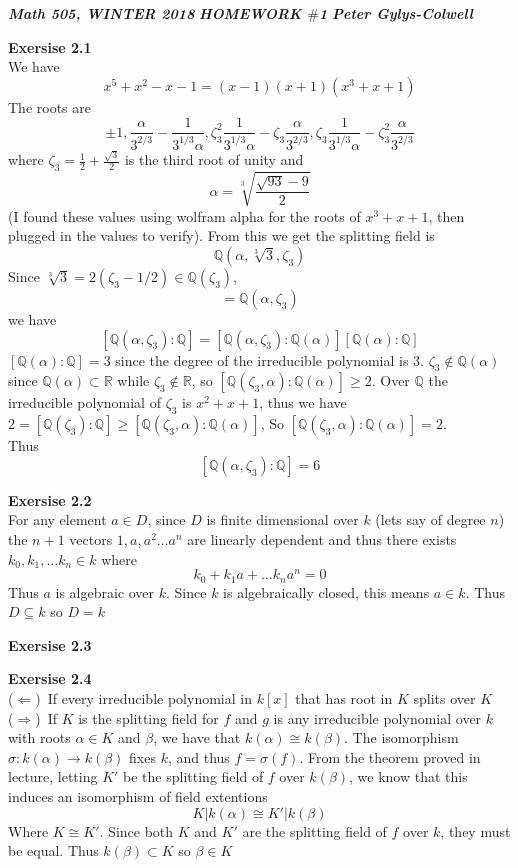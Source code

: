 \documentclass[12pt]{article}
\newenvironment{ques}[1]{\textbf{Exersise #1}\vspace{1 mm}\\ }{\bigskip}
\theoremstyle{definition}
\newcommand{\R}{\mathbb R}
\newcommand{\Q}{\mathbb Q}
\renewcommand{\a}{\alpha}
\begin{document}
\noindent \textit{\textbf{Math 505, WINTER 2018}} \hspace{1.3cm}
\textit{\textbf{HOMEWORK $\#$1}} \hspace{1.3cm} \textit{\textbf{Peter
Gylys-Colwell}} 

\vspace{1cm}

\begin{ques}{2.1}
	We have
	$$x^5 + x^2 - x - 1 = (x - 1)(x + 1)(x^3 + x + 1)$$
	The roots are 
	$$\pm 1, \frac{\a}{3^{2/3}} - \frac{1}{3^{1/3}\a},
	\zeta_3^2\frac{1}{3^{1/3}\a}-\zeta_3\frac{\a}{3^{2/3}},
	\zeta_3\frac{1}{3^{1/3}\a}-\zeta_3^2\frac{\a}{3^{2/3}}$$ 
	where
	$\zeta_3 = \frac 1 2 + \frac {\sqrt 3} {2}$ is the third root of unity and
	$$\a = \sqrt[3]{\frac{\sqrt{93} - 9}{2}}$$
	(I found these values using wolfram alpha for the roots of $x^3 + x + 1$,
	then plugged in the values to verify). From this we get the splitting field
	is $$\Q(\a, \sqrt[3] 3, \zeta_3)$$ Since $\sqrt[3] 3 = 2(\zeta_3 - 1/2) \in
	\Q(\zeta_3)$, $$= \Q(\a, \zeta_3)$$ we have $$[\Q(\a,\zeta_3) : \Q] =
	[\Q(\a,\zeta_3) : \Q(\a)][\Q(\a):\Q]$$ $[\Q(\a): \Q] = 3$ since the degree
	of the irreducible polynomial is 3.  $\zeta_3 \notin \Q(\a)$ since $\Q(\a)
	\subset \R$ while $\zeta_3 \notin \R$, so $[\Q(\zeta_3,\a) : \Q(\a)] \geq
	2$. Over $\Q$ the irreducible polynomial of $\zeta_3$ is $x^2 + x + 1$,
	thus we have $2 = [\Q(\zeta_3) : \Q] \geq [\Q(\zeta_3,\a) : \Q(\a)]$, So
	$[\Q(\zeta_3,\a):\Q(\a)] = 2$.\\ Thus
	$$[\Q(\a,\zeta_3):\Q] = 6$$
\end{ques}

\begin{ques}{2.2}
	For any element $a \in D$, since $D$ is finite dimensional over $k$ (lets
	say of degree $n$) the $n +1$ vectors $1, a, a^2 \dots a^n$ are linearly
	dependent and thus there exists $k_0, k_1, \dots k_n \in k$ where
	$$k_0 + k_1a + \dots k_na^n = 0$$
	Thus $a$ is algebraic over $k$. Since $k$ is algebraically closed, this
	means $a \in k$. Thus $D \subseteq k$ so $D = k$
\end{ques}

\begin{ques}{2.3}
\end{ques}

\begin{ques}{2.4}
	($\Leftarrow$)\ If every irreducible polynomial in $k[x]$ that has root in
	$K$ splits over $K$
	\\
	($\Rightarrow$)\ If $K$ is the splitting field for $f$ and $g$ is any
	irreducible polynomial over $k$ with roots $\a \in K$ and $\beta$, we have
	that $k(\a) \cong k(\beta)$. The isomorphism $\sigma: k(\a) \to k(\beta)$
	fixes $k$, and thus $f = \sigma(f)$. From the theorem proved in
	lecture, letting $K'$ be the splitting field of $f$ over $k(\beta)$, we
	know that this induces an isomorphism of field extentions $$K|k(\alpha)
	\cong K'|k(\beta)$$ Where $K \cong K'$. Since both $K$ and $K'$ are the
	splitting field of $f$ over $k$, they must be equal.  Thus $k(\beta)
	\subset K$ so $\beta \in K$
	
\end{ques}
\end{document}

